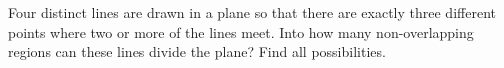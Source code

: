 Four distinct lines are drawn in a plane so that there are exactly three different points where two or more of the lines meet. Into how many non-overlapping regions can these lines divide the plane? Find all possibilities.
